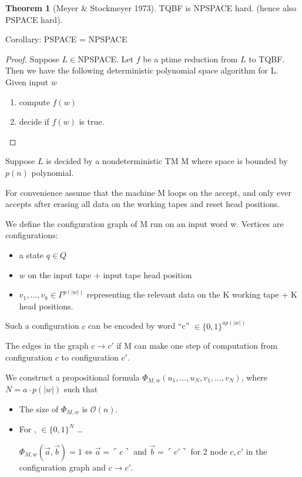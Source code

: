 \documentclass[a4paper,12pt]{article}
\theoremstyle{definition}
\newtheorem{theorem}[counter]{Theorem}
\theoremstyle{remark}
\begin{document}
\begin{theorem}[Meyer $\&$ Stockmeyer 1973]
    TQBF is NPSPACE hard. (hence also PSPACE hard).
\end{theorem}
Corollary: PSPACE = NPSPACE
\begin{proof}
    Suppose $L \in $NPSPACE. Let $f$ be a ptime reduction from $L$ to TQBF. Then we have the following deterministic polynomial space algorithm
    for L. Given input $w$
    \begin{enumerate}
        \item compute $f(w)$
        \item decide if $f(w)$ is true.
    \end{enumerate}
\end{proof}

Suppose $L$ is decided by a nondeterministic TM M where space is bounded by $p(n)$ polynomial.

For convenience assume that the machine M loops on the accept, and only ever accepts after erasing all data on the working tapes and reset head positions.

We define the configuration graph of M run on an input word w. Vertices are configurations:
\begin{itemize}
    \item a state $q \in Q$
    \item $w$ on the input tape + input tape head position
    \item $v_1, \dots, v_k \in \Gamma^{p(|w|)}$ representing the relevant data on the K working tape + K head positions. 
\end{itemize}

Such a configuration $c$ can be encoded by word ``c'' $\in \{0, 1\}^{a p(|w|)}$

The edges in the graph $c \to c'$ if M can make one step of computation from configuration $c$ to configuration $c'$.

We construct a propositional formula $\Phi_{M, w}(u_1, \dots, u_N, v_1, \dots, v_N)$, where $N = a \cdot p(|w|)$ such that
\begin{itemize}
    \item The size of $\Phi_{M, w}$ is $\mathscr{O}(n)$.
    \item For ,  $\in \{0, 1\}^N$ \dots
    
    $\Phi_{M, w}(\overrightarrow{a}, \overrightarrow{b}) = 1 \iff \overrightarrow{a} = \ulcorner c \urcorner$ and $\overrightarrow{b} = \ulcorner c' \urcorner$ for 2 node $c, c'$ in the configuration graph and $c \to c'$.
\end{itemize}
\end{document}
